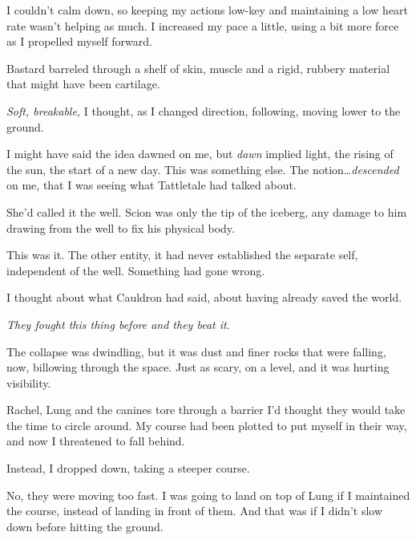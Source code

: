 I couldn't calm down, so keeping my actions low-key and maintaining a low heart rate wasn't helping as much.  I increased my pace a little, using a bit more force as I propelled myself forward.



Bastard barreled through a shelf of skin, muscle and a rigid, rubbery material that might have been cartilage.



\emph{Soft, breakable, }I thought, as I changed direction, following, moving lower to the ground.



I might have said the idea dawned on me, but \emph{dawn} implied light, the rising of the sun, the start of a new day.  This was something else.  The notion\ldots \emph{descended} on me, that I was seeing what Tattletale had talked about.



She'd called it the well.  Scion was only the tip of the iceberg, any damage to him drawing from the well to fix his physical body.



This was it.  The other entity, it had never established the separate self, independent of the well.  Something had gone wrong.



I thought about what Cauldron had said, about having already saved the world.



\emph{They fought this thing before and they beat it}.



The collapse was dwindling, but it was dust and finer rocks that were falling, now, billowing through the space.  Just as scary, on a level, and it was hurting visibility.



Rachel, Lung and the canines tore through a barrier I'd thought they would take the time to circle around.  My course had been plotted to put myself in their way, and now I threatened to fall behind.



Instead, I dropped down, taking a steeper course.



No, they were moving too fast.  I was going to land on top of Lung if I maintained the course, instead of landing in front of them.  And that was if I didn't slow down before hitting the ground.



